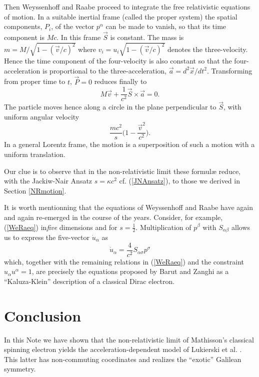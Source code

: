 \documentclass[a4paper,11pt]{article}
\let\ssection=\section
\renewcommand{\section}{\setcounter{equation}{0}\ssection}
\newcommand{\half}{{\scriptstyle{\frac{1}{2}}}}
\newcommand{\vx}{{\vec x}}
\def\vv{{\vec v}}
\def\vP{{\vec P}}
\def\vS{\vec{S}}
\def\vx{{\vec x}}
\begin{document}
Then Weyssenhoff and Raabe proceed to integrate the free relativistic
equations of motion.
In a suitable inertial frame (called the proper system)
the spatial components, $P_{i}$, of the
vector $p^\alpha$ can be made to vanish,
so that its time component is $Mc$.
In this frame $\vS$ is constant. The mass is
$m=M/\sqrt{1-(\vv/c)^2}$ where $v_{i}=u_{i}\sqrt{1-(\vv/c)^2}$
denotes the three-velocity. Hence the time component of the four-velocity
is also constant so that the four-acceleration is proportional
to the three-acceleration, ${\vec a}=d^2\vx/dt^2$.
Transforming from proper time to $t$, $\vP=0$ reduces finally to
\begin{equation}
     M\vv+\frac{1}{c^2}\vS\times{\vec a}=0.
\end{equation}
The particle moves hence along a circle
in the plane perpendicular to $\vS$,
with uniform angular velocity
\begin{equation}
     \frac{mc^2}{s}\Big(1-\frac{\vv^2}{c^2}\Big).
\end{equation}
In a general Lorentz frame, the motion is a superposition of
such a motion with a uniform translation.

Our clue is to observe that in the
non-relativistic limit these formul{\ae} reduce,
with the Jackiw-Nair Ansatz $s=\kappa c^2$
cf. (\ref{JNAnsatz}),
to those we derived in Section \ref{NRmotion}.

It is worth mentionning that the equations of
Weyssenhoff and Raabe have again and again re-emerged
in the course of the years. Consider, for example,
(\ref{WeRaeq}) in{\it five} dimensions and for
$s=\half$. Multiplication of $p^\beta$ with $S_{\alpha\beta}$
allows us to express the five-vector $\dot{u}_{\alpha}$
as
\begin{equation}
     \dot{u}_{\alpha}=\frac{4}{c^2}S_{\alpha\sigma}p^\sigma
\end{equation}
which, together with the remaining relations in (\ref{WeRaeq})
and the constraint $u_{\alpha}u^{\alpha}=1$, are
precisely the equations proposed by Barut and Zanghi
\cite{Barut} as a ``Kaluza-Klein'' description of
a classical Dirac electron.


\section{Conclusion}

In this Note we have shown that the non-relativistic limit of
Mathisson's classical spinning electron yields
the acceleration-dependent model of Lukierski et al. \cite{LSZ}.
This latter has non-commuting coordinates and
  realizes the ``exotic'' Galilean symmetry.
\end{document}
